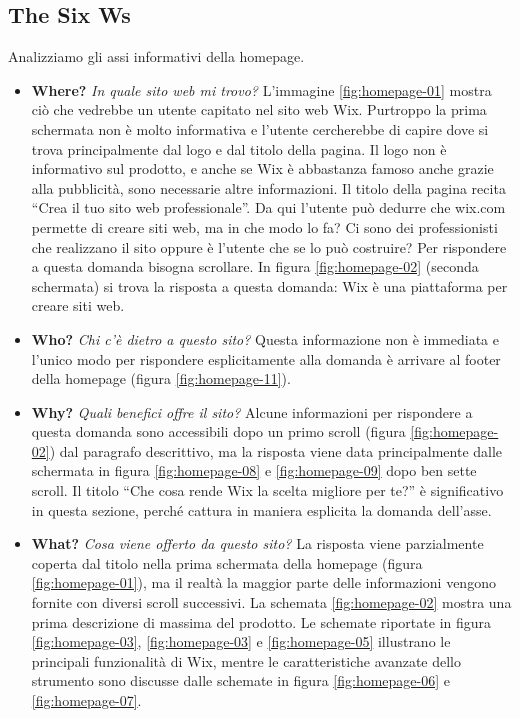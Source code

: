 \documentclass[11pt,a4paper]{article}
\newcommand*{\wix}{Wix}
\newcommand*{\wixcom}{wix.com}
\begin{document}
\subsection{The Six Ws}
\label{subsec:homepage-the-six-ws}

Analizziamo gli assi informativi della homepage.

\begin{itemize}
  \item \textbf{Where?} \textit{In quale sito web mi trovo?}
    L'immagine \ref{fig:homepage-01} mostra ciò che vedrebbe un utente
    capitato nel sito web \wix{}. Purtroppo la prima schermata non è
    molto informativa e l'utente cercherebbe di capire dove si trova
    principalmente dal logo e dal titolo della pagina. Il logo non è
    informativo sul prodotto, e anche se \wix{} è abbastanza famoso
    anche grazie alla pubblicità, sono necessarie altre
    informazioni. Il titolo della pagina recita ``Crea il tuo sito web
    professionale''. Da qui l'utente può dedurre che \wixcom{}
    permette di creare siti web, ma in che modo lo fa? Ci sono dei
    professionisti che realizzano il sito oppure è l'utente che se lo
    può costruire? Per rispondere a questa domanda bisogna
    scrollare. In figura \ref{fig:homepage-02} (seconda schermata) si
    trova la risposta a questa domanda: \wix{} è una piattaforma per
    creare siti web.

  \item \textbf{Who?} \textit{Chi c'è dietro a questo sito?} Questa
    informazione non è immediata e l'unico modo per rispondere
    esplicitamente alla domanda è arrivare al footer della homepage
    (figura \ref{fig:homepage-11}).

  \item \textbf{Why?} \textit{Quali benefici offre il sito?} Alcune
    informazioni per rispondere a questa domanda sono accessibili dopo
    un primo scroll (figura \ref{fig:homepage-02}) dal paragrafo
    descrittivo, ma la risposta viene data principalmente dalle
    schermata in figura \ref{fig:homepage-08} e \ref{fig:homepage-09}
    dopo ben sette scroll. Il titolo ``Che cosa rende Wix la scelta
    migliore per te?'' è significativo in questa sezione, perché
    cattura in maniera esplicita la domanda dell'asse.

  \item \textbf{What?} \textit{Cosa viene offerto da questo sito?} La
    risposta viene parzialmente coperta dal titolo nella prima
    schermata della homepage (figura \ref{fig:homepage-01}), ma il
    realtà la maggior parte delle informazioni vengono fornite con
    diversi scroll successivi. La schemata \ref{fig:homepage-02}
    mostra una prima descrizione di massima del prodotto. Le schemate
    riportate in figura \ref{fig:homepage-03}, \ref{fig:homepage-03} e
    \ref{fig:homepage-05} illustrano le principali funzionalità di
    \wix{}, mentre le caratteristiche avanzate dello strumento sono
    discusse dalle schemate in figura \ref{fig:homepage-06} e
    \ref{fig:homepage-07}.


\end{itemize}
\end{document}
